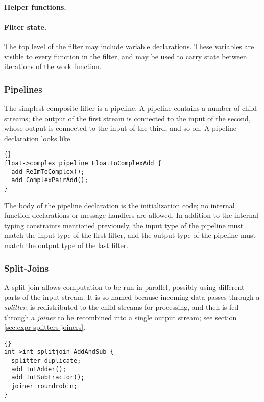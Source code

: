 \documentclass[11pt]{article}
\begin{document}
\paragraph{Helper functions.}

\paragraph{Filter state.}  The top level of the filter may include
variable declarations.  These variables are visible to every function
in the filter, and may be used to carry state between iterations of
the work function.


\subsubsection{Pipelines}

The simplest composite filter is a pipeline.  A pipeline contains a
number of child streams; the output of the first stream is connected
to the input of the second, whose output is connected to the input of
the third, and so on.  A pipeline declaration looks like

\begin{lstlisting}{}
float->complex pipeline FloatToComplexAdd {
  add ReImToComplex();
  add ComplexPairAdd();
}
\end{lstlisting}

The body of the pipeline declaration is the initialization code; no
internal function declarations or message handlers are allowed.  In
addition to the internal typing constraints mentioned previously, the
input type of the pipeline must match the input type of the first
filter, and the output type of the pipeline must match the output type
of the last filter.


\subsubsection{Split-Joins}

A split-join allows computation to be run in parallel, possibly using
different parts of the input stream.  It is so named because incoming
data passes through a \emph{splitter}, is redistributed to the child
streams for processing, and then is fed through a \emph{joiner} to be
recombined into a single output stream; see section
\ref{sec:expr-splitters-joiners}.

\begin{lstlisting}{}
int->int splitjoin AddAndSub {
  splitter duplicate;
  add IntAdder();
  add IntSubtractor();
  joiner roundrobin;
}
\end{lstlisting}
\end{document}
